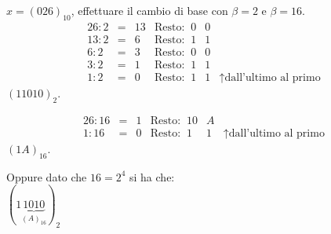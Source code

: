 \begin{ese}
$x = (026)_{10}$, effettuare il cambio di base con $\beta = 2$ e $\beta = 16$.
\[
\begin{array}{cccr|r|l}
26 : 2 & = & 13 & \textrm{Resto: }\ 0 & 0 &\\
13 : 2 & = & 6 & \textrm{Resto: }\ 1 & 1 &\\
6 : 2 & = & 3 & \textrm{Resto: }\ 0 & 0 & \\
3 : 2 & = & 1 & \textrm{Resto: }\ 1 & 1 &\\
1 : 2 & = & 0 & \textrm{Resto: }\ 1 & 1 & \uparrow \textrm{dall'ultimo al 
primo}
\end{array}
\]
$(11010)_2$.

\[
\begin{array}{cccr|r|l}
26 : 16 & = & 1 & \textrm{Resto: }\ 10 & A &\\
1 : 16 & = & 0 & \textrm{Resto: }\ 1 & 1 & \uparrow \textrm{dall'ultimo al 
primo}
\end{array}
\]
$(1A)_{16}$.
\begin{flushleft}
Oppure dato che $16 = 2^4$ si ha che:\\
$(1\underbrace{1010}_{(A)_{16}})_2$
\end{flushleft}
\end{ese}
